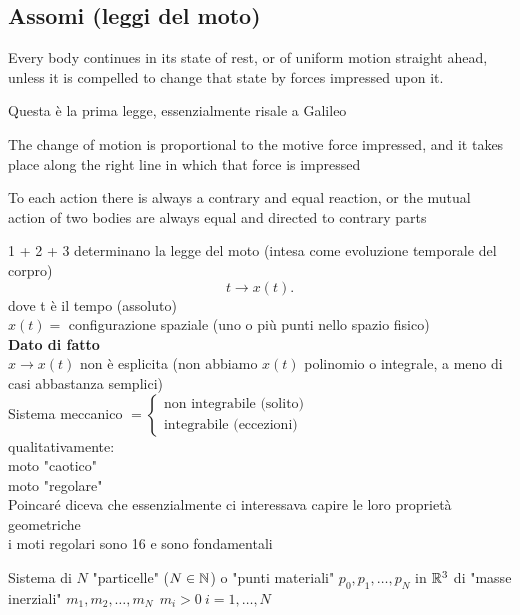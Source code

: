 \documentclass{article}
\begin{document}
	\subsection{Assomi (leggi del moto)}
	\begin{ass}
Every body continues in its state of rest, or of uniform motion straight ahead, unless it is compelled to change that state by forces impressed upon it. 
	\end{ass}
	Questa è la prima legge, essenzialmente risale a Galileo 
	\begin{ass}
		The change of motion is proportional to the motive force impressed, and it takes place along the right line in which that force is impressed
	\end{ass}
	\begin{ass}
		To each action there is always a contrary and equal reaction, or the mutual action of two bodies are always equal and directed to contrary parts
	\end{ass}
	1 + 2 + 3 determinano la legge del moto (intesa come evoluzione temporale del corpro)\\
	\[
	 t \rightarrow x(t)
	.\] 
	dove t è il tempo (assoluto)\\
	$x(t)=$ configurazione spaziale (uno o più punti nello spazio fisico)\\
	\textbf{Dato di fatto}\\
	$ x \rightarrow x(t)$ non è esplicita (non abbiamo $x(t)$ polinomio o integrale, a meno di casi abbastanza semplici)\\
	Sistema meccanico $ = \begin{cases}
		\text{non integrabile (solito)}\\
		\text{integrabile (eccezioni)}
	\end{cases}$ \\
	qualitativamente:\\
	moto "caotico"\\
	moto "regolare"\\
	Poincaré diceva che essenzialmente ci interessava capire le loro proprietà geometriche\\
	i moti regolari sono 16 e sono fondamentali\\
	\begin{defi}
		Sistema di $N$ "particelle" ($N\in\mathbb{N}$) o "punti materiali" $p_0,p_1,\ldots,p_N$ in $\mathbb{R}^3$ di "masse inerziali"  $m_1,m_2,\ldots, m_N \ \ m_i>0 \ i=1,\ldots,N$
	\end{defi}
\end{document}
